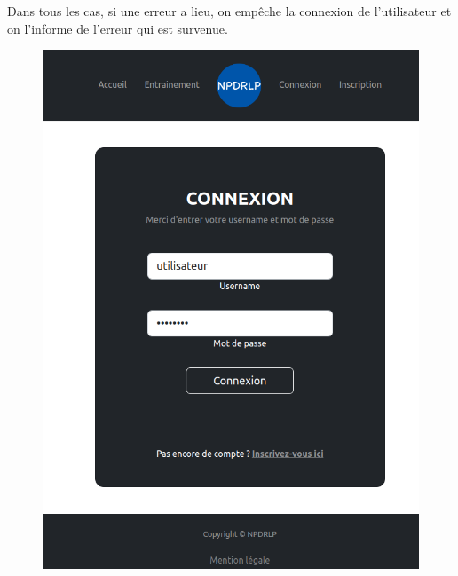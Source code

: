 \documentclass[12pt,french]{article}
\begin{document}
\medskip

Dans tous les cas, si une erreur a lieu, on empêche la connexion de l'utilisateur et on l'informe de l'erreur qui est survenue.

\begin{figure}[H]
	\centering
	\begin{minipage}{.5\textwidth}
		\centering
		\includegraphics[scale=0.25]{connec1.png}
	\end{minipage}%
	\begin{minipage}{.5\textwidth}
		\centering

\end{minipage}
\end{figure}
\end{document}
